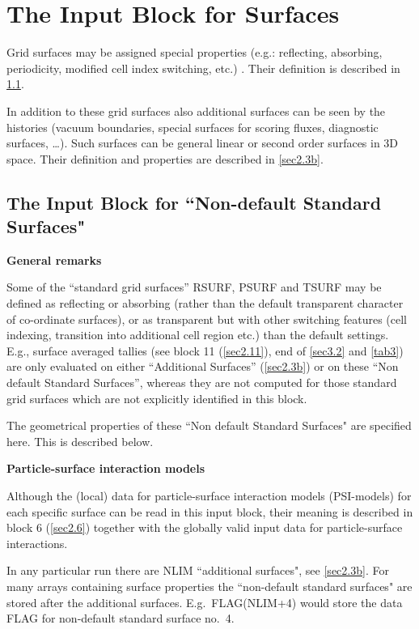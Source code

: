\section{The Input Block for Surfaces}
\label{sec2.3}
Grid surfaces may be assigned special properties (e.g.: reflecting, absorbing,
periodicity, modified cell index switching, etc.)
.
Their definition is described in \cref{sec2.3a}.

In addition to these grid surfaces also additional surfaces can be seen by the
histories (vacuum boundaries, special surfaces for scoring fluxes, diagnostic
surfaces, \dots).
Such surfaces can be general linear or second order surfaces in 3D space.
Their definition and properties are described in \cref{sec2.3b}.

\subsection{The Input Block for ``Non-default Standard Surfaces"}
\label{sec2.3a}

\textbf{General remarks} 

\medskip 

Some of the ``standard grid surfaces'' RSURF, PSURF and TSURF may be defined as
reflecting or absorbing (rather than the default transparent character of
co-ordinate surfaces), or as transparent but with other switching features
(cell indexing, transition into additional cell region etc.) than the default
settings.
E.g., surface averaged tallies (see block 11 (\cref{sec2.11}), end of
\cref{sec3.2} and \cref{tab3}) are only evaluated on either ``Additional
Surfaces'' (\cref{sec2.3b}) or on these ``Non default Standard Surfaces'',
whereas they are not computed for those standard grid surfaces which are not
explicitly identified in this block.

The geometrical properties of these ``Non default Standard Surfaces" are
specified here.
This is described below.

\textbf{Particle-surface interaction models} 

Although the (local) data for particle-surface interaction models (PSI-models)
for each specific surface can be read in this input block, their meaning is
described in block 6 (\cref{sec2.6}) together with the globally valid input
data for particle-surface interactions.

In any particular run there are NLIM ``additional surfaces", see
\cref{sec2.3b}.
For many arrays containing surface properties the ``non-default standard
surfaces" are stored after the additional surfaces.
E.g.\ FLAG(NLIM+4) would store the data FLAG for non-default standard surface
no.\ 4.

